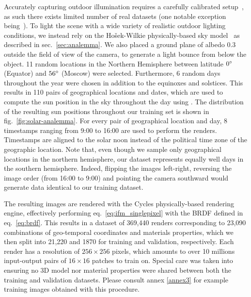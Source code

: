 Accurately capturing outdoor illumination requires a carefully calibrated setup~\cite{stumpfel-afrigraph-04}, as such there exists limited number of real datasets (one notable exception being~\cite{hdrdb}). To light the scene with a wide variety of realistic outdoor lighting conditions, we instead rely on the Ho\v{s}ek-Wilkie physically-based sky model~\cite{hosek-siggraph-12} as described in sec.~\ref{sec:analemma}. We also placed a ground plane of albedo 0.3 outside the field of view of the camera, to generate a light bounce from below the object. 11 random locations in the Northern Hemisphere between latitude $0^{\circ}$ (Equator) and $56^{\circ}$ (Moscow) were selected. Furthermore, 6 random days throughout the year were chosen in addition to the equinoxes and solstices. This results in 110 pairs of geographical locations and dates, which are used to compute the sun position in the sky throughout the day using \cite{bretagnon-aaa-88}. The distribution of the resulting sun positions throughout our training set is shown in fig.~\ref{fig:solar-analemma}. For every pair of geographical location and day, 8 timestamps ranging from 9:00 to 16:00 are used to perform the renders. Timestamps are aligned to the solar noon instead of the political time zone of the geographic location. Note that, even though we sample only geographical locations in the northern hemisphere, our dataset represents equally well days in the southern hemisphere. Indeed, flipping the images left-right, reversing the image order (from 16:00 to 9:00) and pointing the camera southward would generate data identical to our training dataset.

The resulting images are rendered with the Cycles physically-based rendering engine, effectively performing eq.~\eqref{eq:ifm_singlepixel} with the BRDF defined in eq.~\eqref{eq:brdf}. This results in a dataset of 369,440 renders corresponding to 23,090 combinations of geo-temporal coordinates and materials properties, which we then split into 21,220 and 1870 for training and validation, respectively. Each render has a resolution of $256 \times 256$ pixels, which amounts to over 10 millions input-output pairs of $16 \times 16$ patches to train on. Special care was taken into ensuring no 3D model nor material properties were shared between both the training and validation datasets. Please consult annex \ref{annex3} for example training images obtained with this procedure. 

